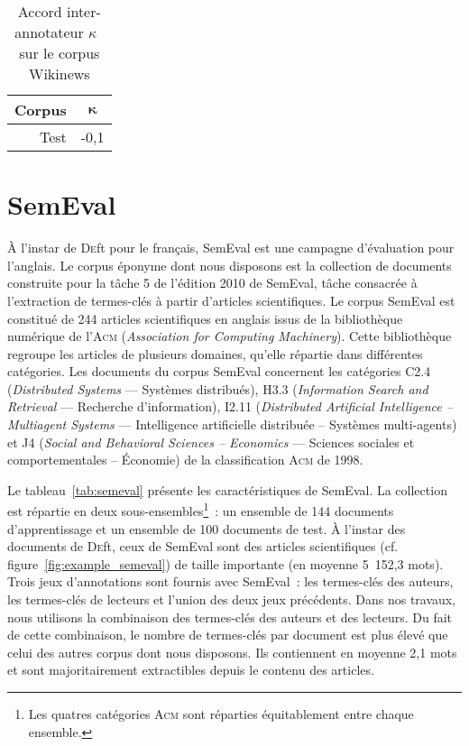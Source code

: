     \begin{table}[!h]
      \centering
      \begin{tabular}{r|c}
        \toprule
        \textbf{Corpus} & $\boldsymbol{\kappa}$\\
        \hline
        Test & -0,1\\
        \bottomrule
      \end{tabular}

      \caption{Accord inter-annotateur $\kappa$~\cite{fleiss1971kappa} sur le
               corpus Wikinews
               \label{tab:wikinews_kappa}}
    \end{table}


  \section[SemEval]{SemEval~\textnormal{\large\cite{kim2010semeval}}}
  \label{sec:main-data_description-semeval_data}
    À l'instar de \textsc{De}ft pour le français, SemEval est une campagne
    d'évaluation pour l'anglais. Le corpus éponyme dont nous disposons est la
    collection de documents construite pour la tâche 5 de l'édition 2010 de
    SemEval, tâche consacrée à l'extraction de termes-clés à partir d'articles
    scientifiques. Le corpus SemEval est constitué de 244 articles scientifiques
    en anglais issus de la bibliothèque numérique de l'\textsc{Acm}
    (\textit{Association for Computing Machinery}). Cette bibliothèque regroupe
    les articles de plusieurs domaines, qu'elle répartie dans différentes
    catégories. Les documents du corpus SemEval concernent les catégories C2.4
    (\textit{Distributed Systems} --- Systèmes distribués), H3.3
    (\textit{Information Search and Retrieval} --- Recherche d'information),
    I2.11 (\textit{Distributed Artificial Intelligence -- Multiagent Systems}
    --- Intelligence artificielle distribuée -- Systèmes multi-agents) et J4
    (\textit{Social and Behavioral Sciences -- Economics} --- Sciences sociales
    et comportementales -- Économie) de la classification \textsc{Acm} de 1998.
    
    Le tableau~\ref{tab:semeval} présente les caractéristiques de SemEval. La
    collection est répartie en deux sous-ensembles\footnote{Les quatres
    catégories \textsc{Acm} sont réparties équitablement entre chaque
    ensemble.}~: un ensemble de 144 documents d'apprentissage et un ensemble de
    100 documents de test. À l'instar des documents de \textsc{De}ft, ceux de
    SemEval sont des articles scientifiques (cf.
    figure~\ref{fig:example_semeval}) de taille importante (en moyenne 5~152,3
    mots). Trois jeux d'annotations sont fournis avec SemEval~: les termes-clés
    des auteurs, les termes-clés de lecteurs et l'union des deux jeux
    précédents. Dans nos travaux, nous utilisons la combinaison des termes-clés
    des auteurs et des lecteurs. Du fait de cette combinaison, le nombre de
    termes-clés par document est plus élevé que celui des autres corpus dont
    nous disposons. Ils contiennent en moyenne 2,1 mots et sont majoritairement
    extractibles depuis le contenu des articles.

